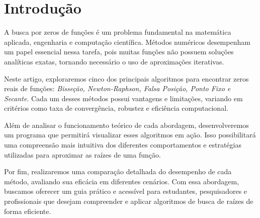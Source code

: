 \section{Introdução}

A busca por zeros de funções é um problema fundamental na matemática aplicada,
engenharia e computação científica. Métodos numéricos desempenham um papel
essencial nessa tarefa, pois muitas funções não possuem soluções analíticas
exatas, tornando necessário o uso de aproximações iterativas.

Neste artigo, exploraremos cinco dos principais algoritmos para encontrar zeros
reais de funções: \textit{Bisseção, Newton-Raphson, Falsa Posição, Ponto Fixo e
Secante}. Cada um desses métodos possui vantagens e limitações, variando em
critérios como taxa de convergência, robustez e eficiência
computacional.\cite{asano2009calculo}

Além de analisar o funcionamento teórico de cada abordagem, desenvolveremos um
programa que permitirá visualizar esses algoritmos em ação. Isso possibilitará
uma compreensão mais intuitiva dos diferentes comportamentos e estratégias
utilizadas para aproximar as raízes de uma função.

Por fim, realizaremos uma comparação detalhada do desempenho de cada método,
avaliando sua eficácia em diferentes cenários. Com essa abordagem, buscamos
oferecer um guia prático e acessível para estudantes, pesquisadores e
profissionais que desejam compreender e aplicar algoritmos de busca de raízes de
forma eficiente.\cite{ruggiero1996calculo}
